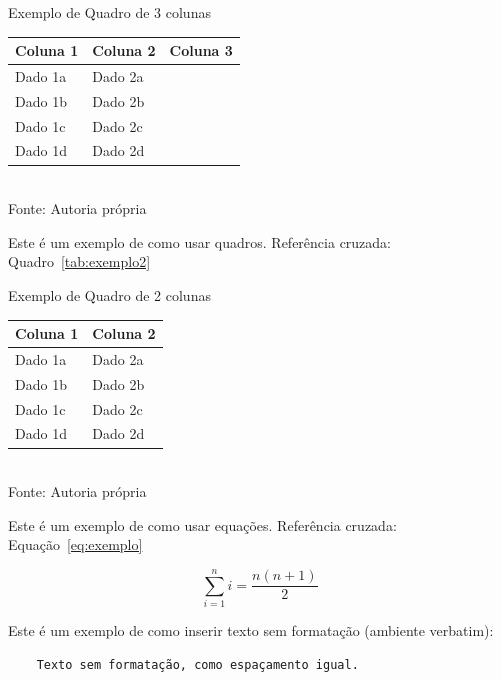 \begin{quadro}[!htbp]
\centering
\caption{Exemplo de Quadro de 3 colunas}
	\begin{tabular}{ | m{10em} | m{4cm}| m{4cm} | }
		\hline
		\textbf{Coluna 1} & \textbf{Coluna 2} & \textbf{Coluna 3} \\ \hline
		Dado 1a           & Dado 2a & \\ \hline
		Dado 1b           & Dado 2b & \\ \hline
		Dado 1c           & Dado 2c & \\ \hline
		Dado 1d           & Dado 2d & \\ \hline
	\end{tabular}
	\\ \vspace{0.2cm}
	Fonte: Autoria própria
	\label{tab:exemploquad}
\end{quadro}


Este é um exemplo de como usar quadros. Referência cruzada: Quadro~\ref{tab:exemplo2}


\begin{quadro}[!htbp]
\centering
\caption{Exemplo de Quadro de 2 colunas}
	\begin{tabular}{ | m{10em} | m{4cm}| }
		\hline
		\textbf{Coluna 1} & \textbf{Coluna 2}  \\ \hline
		Dado 1a           & Dado 2a  \\ \hline
		Dado 1b           & Dado 2b  \\ \hline
		Dado 1c           & Dado 2c  \\ \hline
		Dado 1d           & Dado 2d  \\ \hline
	\end{tabular}
	\\ \vspace{0.2cm}
	Fonte: Autoria própria
	\label{tab:exemplo2}
\end{quadro}


Este é um exemplo de como usar equações. Referência cruzada: Equação~\ref{eq:exemplo}

\begin{equation}
\sum_{i=1}^{n} i = \frac{n(n+1)}{2}
\label{eq:exemplo}
\end{equation}

\clearpage


Este é um exemplo de como inserir texto sem formatação (ambiente verbatim):

\begin{verbatim}
	Texto sem formatação, como espaçamento igual.
\end{verbatim}


